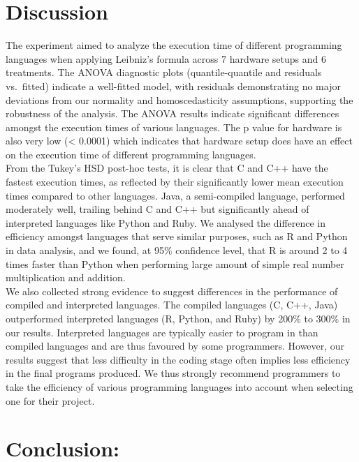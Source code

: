 \documentclass[12pt,halfline,a4paper,]{ouparticle}
\begin{document}
\section{Discussion}\label{discussion}

The experiment aimed to analyze the execution time of different
programming languages when applying Leibniz's formula across 7 hardware
setups and 6 treatments. The ANOVA diagnostic plots (quantile-quantile
and residuals vs.~fitted) indicate a well-fitted model, with residuals
demonstrating no major deviations from our normality and
homoscedasticity assumptions, supporting the robustness of the analysis.
The ANOVA results indicate significant differences amongst the execution
times of various languages. The p value for hardware is also very low
(\textless{} 0.0001) which indicates that hardware setup does have an
effect on the execution time of different programming languages.\\
From the Tukey's HSD post-hoc tests, it is clear that C and C++ have the
fastest execution times, as reflected by their significantly lower mean
execution times compared to other languages. Java, a semi-compiled
language, performed moderately well, trailing behind C and C++ but
significantly ahead of interpreted languages like Python and Ruby. We
analysed the difference in efficiency amongst languages that serve
similar purposes, such as R and Python in data analysis, and we found,
at 95\% confidence level, that R is around 2 to 4 times faster than
Python when performing large amount of simple real number multiplication
and addition.\\
We also collected strong evidence to suggest differences in the
performance of compiled and interpreted languages. The compiled
languages (C, C++, Java) outperformed interpreted languages (R, Python,
and Ruby) by 200\% to 300\% in our results. Interpreted languages are
typically easier to program in than compiled languages and are thus
favoured by some programmers. However, our results suggest that less
difficulty in the coding stage often implies less efficiency in the
final programs produced. We thus strongly recommend programmers to take
the efficiency of various programming languages into account when
selecting one for their project.

\section{Conclusion:}\label{conclusion}
\end{document}
